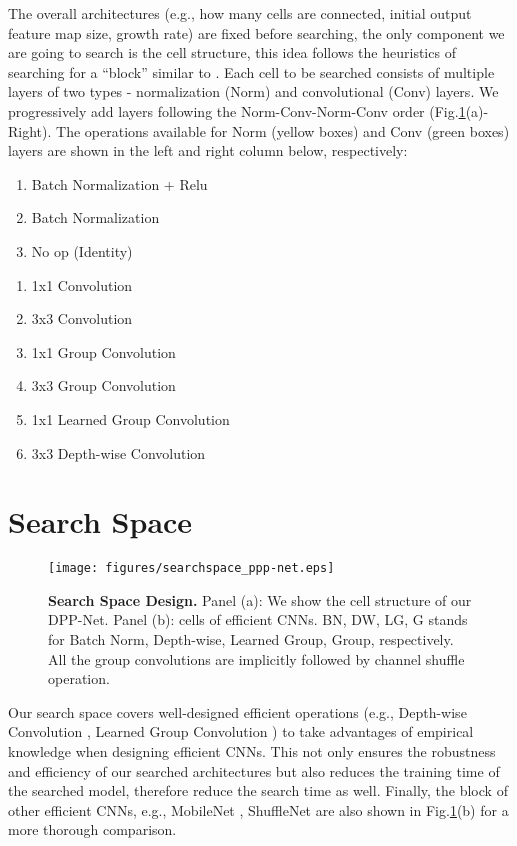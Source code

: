 \documentclass[runningheads]{llncs}
\def\eg{e.g.}
\begin{document}
The overall architectures (\eg, how many cells are connected, initial output feature map size, growth rate) are fixed before searching, the only component we are going to search is the cell structure, this idea follows the heuristics of searching for a ``block'' similar to \cite{zoph2017learning,liu2017progressive}. Each cell to be searched consists of multiple layers of two types - normalization (Norm) and convolutional (Conv) layers. We progressively add layers following the Norm-Conv-Norm-Conv order (Fig.\ref{fig.searchspace}(a)-Right). The operations available for Norm (yellow boxes) and Conv (green boxes) layers are shown in the left and right column below, respectively:

\begin{multicols}{2}
\begin{enumerate}
	\item Batch Normalization + Relu
	\item Batch Normalization
    \item No op (Identity)
\end{enumerate}
\hfill\linebreak
\begin{enumerate}
	\item 1x1 Convolution
	\item 3x3 Convolution
    \item 1x1 Group Convolution
    \item 3x3 Group Convolution
    \item 1x1 Learned Group Convolution
    \item 3x3 Depth-wise Convolution
\end{enumerate}
\end{multicols}\section{Search Space}\begin{figure}[h]
\begin{center}
\texttt{[image: figures/searchspace\_ppp-net.eps]}
\end{center}
\caption{\textbf{Search Space Design.}
Panel (a):  We show the cell structure of our DPP-Net. Panel (b): cells of efficient CNNs. BN, DW, LG, G stands for Batch Norm, Depth-wise, Learned Group, Group, respectively. All the group convolutions are implicitly followed by channel shuffle operation.}
\label{fig.searchspace}
\end{figure}

Our search space covers well-designed efficient operations (\eg, Depth-wise Convolution \cite{chollet2016xception}, Learned Group Convolution \cite{huang2017condensenet}) to take advantages of empirical knowledge when designing efficient CNNs. This not only ensures the robustness and efficiency of our searched architectures but also reduces the training time of the searched model, therefore reduce the search time as well. Finally, the block of other efficient CNNs, \eg, MobileNet \cite{howard2017mobilenets}, ShuffleNet \cite{zhang2017shufflenet} are also shown in Fig.\ref{fig.searchspace}(b) for a more thorough comparison.
\end{document}
